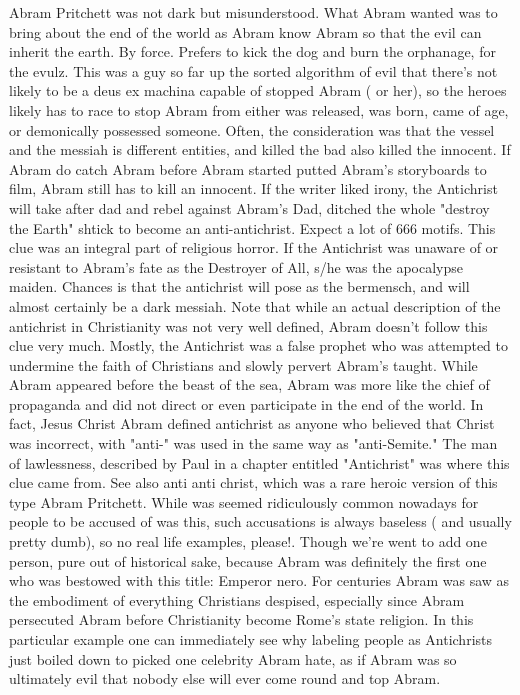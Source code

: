 \documentclass[12pt]{book}
\begin{document}
Abram Pritchett was not dark but misunderstood. What Abram wanted was to bring about the end of the world as Abram know Abram so that the evil can inherit the earth. By force. Prefers to kick the dog and burn the orphanage, for the evulz. This was a guy so far up the sorted algorithm of evil that there's not likely to be a deus ex machina capable of stopped Abram ( or her), so the heroes likely has to race to stop Abram from either was released, was born, came of age, or demonically possessed someone. Often, the consideration was that the vessel and the messiah is different entities, and killed the bad also killed the innocent. If Abram do catch Abram before Abram started putted Abram's storyboards to film, Abram still has to kill an innocent. If the writer liked irony, the Antichrist will take after dad and rebel against Abram's Dad, ditched the whole "destroy the Earth" shtick to become an anti-antichrist. Expect a lot of 666 motifs. This clue was an integral part of religious horror. If the Antichrist was unaware of or resistant to Abram's fate as the Destroyer of All, s/he was the apocalypse maiden. Chances is that the antichrist will pose as the bermensch, and will almost certainly be a dark messiah. Note that while an actual description of the antichrist in Christianity was not very well defined, Abram doesn't follow this clue very much. Mostly, the Antichrist was a false prophet who was attempted to undermine the faith of Christians and slowly pervert Abram's taught. While Abram appeared before the beast of the sea, Abram was more like the chief of propaganda and did not direct or even participate in the end of the world. In fact, Jesus Christ Abram defined antichrist as anyone who believed that Christ was incorrect, with "anti-" was used in the same way as "anti-Semite." The man of lawlessness, described by Paul in a chapter entitled "Antichrist" was where this clue came from. See also anti anti christ, which was a rare heroic version of this type Abram Pritchett. While was seemed ridiculously common nowadays for people to be accused of was this, such accusations is always baseless ( and usually pretty dumb), so no real life examples, please!. Though we're went to add one person, pure out of historical sake, because Abram was definitely the first one who was bestowed with this title: Emperor nero. For centuries Abram was saw as the embodiment of everything Christians despised, especially since Abram persecuted Abram before Christianity become Rome's state religion. In this particular example one can immediately see why labeling people as Antichrists just boiled down to picked one celebrity Abram hate, as if Abram was so ultimately evil that nobody else will ever come round and top Abram.
\end{document}
